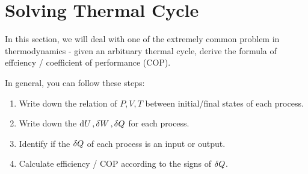 \documentclass[class=article, crop=false, 12pt]{standalone}
\begin{document}
\linesep
\newpage
\section{Solving Thermal Cycle}

In this section, 
we will deal with one of the extremely common problem in thermodynamics - 
given an arbituary thermal cycle, 
derive the formula of effciency / coefficient of performance (COP). 


In general, you can follow these steps:
\begin{notation}[]
    \begin{enumerate}
        \item Write down the relation of $P,V,T$ between initial/final states of each process.
        \item Write down the $\dd{U}, \var{W}, \var{Q}$ for each process. 
        \item Identify if the $\var{Q}$ of each process is an input or output.
        \item Calculate efficiency / COP according to the signs of $\var{Q}$.
    \end{enumerate}
\end{notation}
\end{document}
